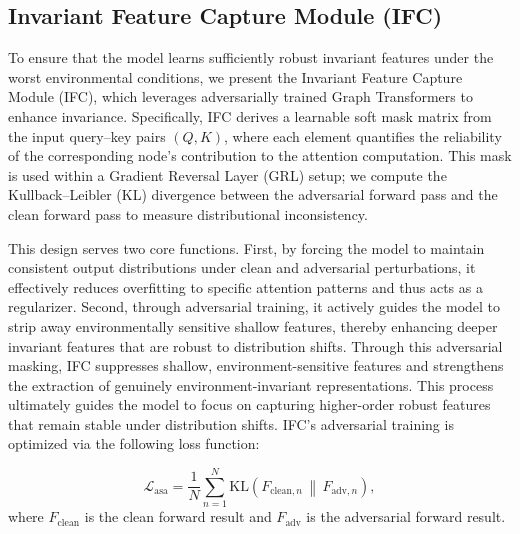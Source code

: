 \documentclass[a4paper,fleqn]{cas-dc}
\begin{document}
\label{epm}

\subsection{Invariant Feature Capture Module (IFC)}




To ensure that the model learns sufficiently robust invariant features under the worst environmental conditions, we present the Invariant Feature Capture Module (IFC), which leverages adversarially trained Graph Transformers to enhance invariance. Specifically, IFC derives a learnable soft mask matrix from the input query–key pairs \((Q,K)\), where each element quantifies the reliability of the corresponding node’s contribution to the attention computation. This mask is used within a Gradient Reversal Layer (GRL) setup; we compute the Kullback–Leibler (KL) divergence between the adversarial forward pass and the clean forward pass to measure distributional inconsistency.


{\color{blue}This design serves two core functions. First, by forcing the model to maintain consistent output distributions under clean and adversarial perturbations, it effectively reduces overfitting to specific attention patterns and thus acts as a regularizer. Second, through adversarial training, it actively guides the model to strip away environmentally sensitive shallow features, thereby enhancing deeper invariant features that are robust to distribution shifts. Through this adversarial masking, IFC suppresses shallow, environment-sensitive features and strengthens the extraction of genuinely environment-invariant representations. This process ultimately guides the model to focus on capturing higher-order robust features that remain stable under distribution shifts.} IFC's adversarial training is optimized via the following loss function:

\[
\mathcal{L}_{\mathrm{asa}} = \frac{1}{N} \sum_{n=1}^{N}  \mathrm{KL}\!\left( F_{\mathrm{clean}, n} \,\middle\|\, F_{\mathrm{adv}, n} \right),\tag{4}
\]
where \(F_{\mathrm{clean}}\) is the clean forward result and \(F_{\mathrm{adv}}\) is the adversarial forward result.
\end{document}
